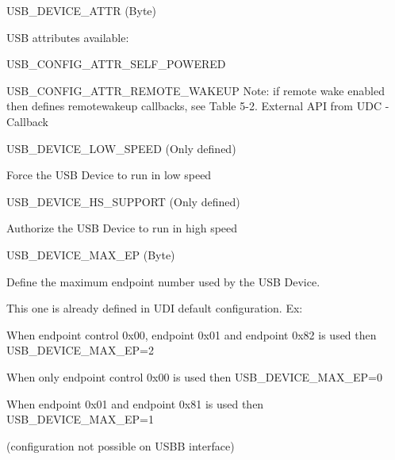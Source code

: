 U\-S\-B\-\_\-\-D\-E\-V\-I\-C\-E\-\_\-\-A\-T\-T\-R (Byte)\par
 U\-S\-B attributes available\-:
\begin{DoxyItemize}
\item U\-S\-B\-\_\-\-C\-O\-N\-F\-I\-G\-\_\-\-A\-T\-T\-R\-\_\-\-S\-E\-L\-F\-\_\-\-P\-O\-W\-E\-R\-E\-D
\item U\-S\-B\-\_\-\-C\-O\-N\-F\-I\-G\-\_\-\-A\-T\-T\-R\-\_\-\-R\-E\-M\-O\-T\-E\-\_\-\-W\-A\-K\-E\-U\-P Note\-: if remote wake enabled then defines remotewakeup callbacks, see Table 5-\/2. External A\-P\-I from U\-D\-C -\/ Callback
\end{DoxyItemize}

U\-S\-B\-\_\-\-D\-E\-V\-I\-C\-E\-\_\-\-L\-O\-W\-\_\-\-S\-P\-E\-E\-D (Only defined)\par
 Force the U\-S\-B Device to run in low speed

U\-S\-B\-\_\-\-D\-E\-V\-I\-C\-E\-\_\-\-H\-S\-\_\-\-S\-U\-P\-P\-O\-R\-T (Only defined)\par
 Authorize the U\-S\-B Device to run in high speed

U\-S\-B\-\_\-\-D\-E\-V\-I\-C\-E\-\_\-\-M\-A\-X\-\_\-\-E\-P (Byte)\par
 Define the maximum endpoint number used by the U\-S\-B Device.\par
 This one is already defined in U\-D\-I default configuration. Ex\-:
\begin{DoxyItemize}
\item When endpoint control 0x00, endpoint 0x01 and endpoint 0x82 is used then U\-S\-B\-\_\-\-D\-E\-V\-I\-C\-E\-\_\-\-M\-A\-X\-\_\-\-E\-P=2
\item When only endpoint control 0x00 is used then U\-S\-B\-\_\-\-D\-E\-V\-I\-C\-E\-\_\-\-M\-A\-X\-\_\-\-E\-P=0
\item When endpoint 0x01 and endpoint 0x81 is used then U\-S\-B\-\_\-\-D\-E\-V\-I\-C\-E\-\_\-\-M\-A\-X\-\_\-\-E\-P=1\par
 (configuration not possible on U\-S\-B\-B interface) 
\end{DoxyItemize}

